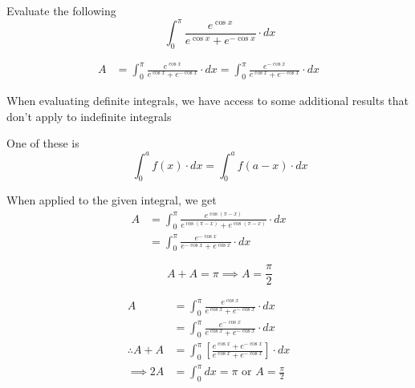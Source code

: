 \documentclass[14pt,fleqn]{extarticle}
\begin{document}
\newcommand\ec{e^{\cos x}}
\newcommand\emc{e^{-\cos x}}
\newcommand\dnm{\ec + \emc} 

Evaluate the following \[ \qquad \int_0^\pi \frac{\ec}{\dnm}\cdot dx \]
%

\newcard

\begin{align}
	A &= \int_0^\pi \frac{\ec}{\dnm}\cdot dx = \int_0^\pi \frac{\emc}{\dnm}\cdot dx 
\end{align}

\newcard 

When evaluating definite integrals, we have access to some additional results that don't apply to indefinite integrals \newline 

One of these is \[\qquad \int_0^a f(x)\cdot dx = \int_0^a f \left(a-x \right)\cdot dx\]

When applied to the given integral, we get 
\begin{align}
	A &= \int_0^\pi \frac{e^{\cos \left(\pi -x \right)}}{e^{\cos \left(\pi -x \right)} + e^{\cos \left(\pi - x \right)}}\cdot dx  \\
	&= \int_0^\pi \frac{\emc}{\emc + \ec}\cdot dx 
\end{align}

\newcard 

\[ \qquad A +A = \pi \implies A = \frac\pi{2} \]

\newcard 

\begin{align}
A &= \int_0^\pi \frac{\ec}{\dnm}\cdot dx \\ 
&= \int_0^\pi \frac{\emc}{\dnm}\cdot dx \\
\therefore A + A &= \int_0^\pi \left[\frac{\ec + \emc}{\dnm} \right]\cdot dx \\
\implies 2A &= \int_0^\pi dx = \pi \text{ or } A = \frac\pi{2} 
\end{align}
\end{document}
